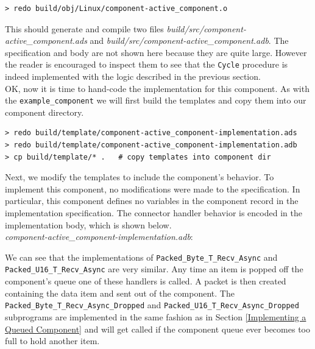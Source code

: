 \vspace{5mm} %
\begin{verbatim}
> redo build/obj/Linux/component-active_component.o
\end{verbatim}
\vspace{5mm} %

This should generate and compile two files \textit{build/src/component-active\_component.ads} and \textit{build/src/component-active\_component.adb}. The specification and body are not shown here because they are quite large. However the reader is encouraged to inspect them to see that the \texttt{Cycle} procedure is indeed implemented with the logic described in the previous section. \\

OK, now it is time to hand-code the implementation for this component. As with the \texttt{example\_component} we will first build the templates and copy them into our component directory.

\vspace{5mm} %
\begin{verbatim}
> redo build/template/component-active_component-implementation.ads 
> redo build/template/component-active_component-implementation.adb 
> cp build/template/* .   # copy templates into component dir
\end{verbatim}
\vspace{5mm} %

Next, we modify the templates to include the component's behavior. To implement this component, no modifications were made to the specification. In particular, this component defines no variables in the component record in the implementation specification. The connector handler behavior is encoded in the implementation body, which is shown below. \\

\textit{component-active\_component-implementation.adb}:

We can see that the implementations of \texttt{Packed\_Byte\_T\_Recv\_Async} and \texttt{Packed\_U16\_T\_Recv\_Async} are very similar. Any time an item is popped off the component's queue one of these handlers is called. A packet is then created containing the data item and sent out of the component. The \texttt{Packed\_Byte\_T\_Recv\_Async\_Dropped} and \texttt{Packed\_U16\_T\_Recv\_Async\_Dropped} subprograms are implemented in the same fashion as in Section \ref{Implementing a Queued Component} and will get called if the component queue ever becomes too full to hold another item. \\

